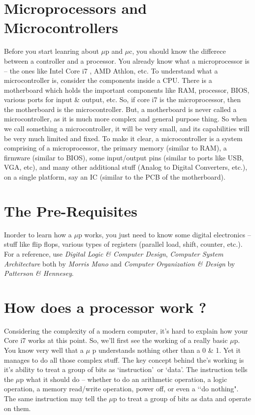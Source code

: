 \documentclass{book}
\begin{document}
\section{Microprocessors and Microcontrollers}
Before you start leanring about $\mu$p and $\mu$c, you should know the differece
between a controller and a processor. You already know what a microprocessor is
-- the ones like Intel Core i7 , AMD Athlon, etc. To understand what a
microcontroller is, consider the components inside a CPU. There is a motherboard
which holds the important components like RAM, processor, BIOS, various ports
for input \& output, etc. So, if core i7 is the microprocessor, then the
motherboard is the microcontroller. But, a motherboard is never called a
microcontroller, as it is much more complex and general purpose thing. So when
we call something a microcontroller, it will be very small, and its capabilities
will be very much limited and fixed. To make it clear, a microcontroller is a
system
comprising of a microprocessor, the primary memory (similar to RAM), a firmware
(similar to BIOS), some input/output pins (similar to ports like USB, VGA, etc),
and many other additional stuff (Analog to Digital Converters, etc.), on a
single platform, say an IC (similar to the PCB of the motherboard).

\section*{The Pre-Requisites}

Inorder to learn how a $\mu$p works, you just need to know some digital
electronics -- stuff like flip flops, various types of registers (parallel load,
shift, counter, etc.). For a reference, use \emph{Digital Logic \&
Computer Design}, \emph{Computer System Architecture} both by \emph{Morris Mano}
and \emph{Computer Organization \& Design} by \emph{Patterson \& Hennesey}.


\section{How does a processor work ?}

Considering the complexity of a modern computer, it\rq s hard to explain how
your
Core i7 works at this point. So, we\rq ll first see the working of a really
basic $\mu$p. You know very well
that a $\mu$ p understands nothing other than a 0 \& 1. Yet it manages to do all
those
complex stuff. The key concept behind the\rq s working is it\rq s ability to
treat a group of
bits as \lq instruction\rq\ or \lq data\rq. The instruction tells the $\mu$p what
it
should do -- whether to do an arithmetic operation, a logic operation, a memory read/write
operation, power off, or even a \lq\lq do nothing".
The same instruction may tell the $\mu$p to treat a group of bits as data and
operate on them. 
\end{document}
